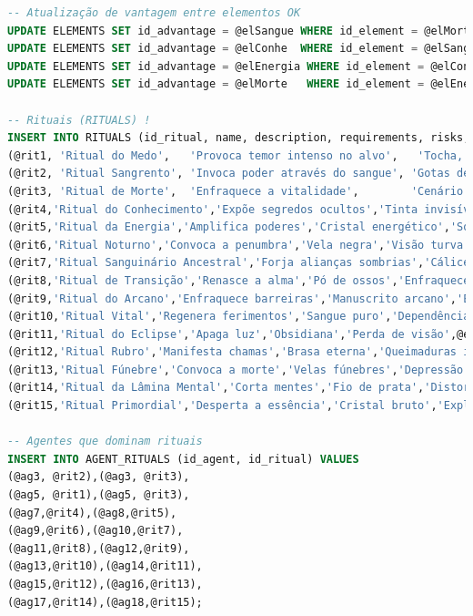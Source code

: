 \documentclass[12pt,a4paper]{report}
\begin{document}
\begin{lstlisting}[language=SQL, caption=population.sql]
-- Atualização de vantagem entre elementos OK
UPDATE ELEMENTS SET id_advantage = @elSangue WHERE id_element = @elMorte;
UPDATE ELEMENTS SET id_advantage = @elConhe  WHERE id_element = @elSangue;
UPDATE ELEMENTS SET id_advantage = @elEnergia WHERE id_element = @elConhe;
UPDATE ELEMENTS SET id_advantage = @elMorte   WHERE id_element = @elEnergia;

-- Rituais (RITUALS) !
INSERT INTO RITUALS (id_ritual, name, description, requirements, risks, id_element) VALUES
(@rit1, 'Ritual do Medo',   'Provoca temor intenso no alvo',   'Tocha, sal grosso',              'Reações psicóticas', @elMedo),
(@rit2, 'Ritual Sangrento', 'Invoca poder através do sangue', 'Gotas de sangue verdadeiro',     'Hemorragia grave',   @elSangue),
(@rit3, 'Ritual de Morte',  'Enfraquece a vitalidade',        'Cenário fúnebre, ossos',         'Desgaste físico',    @elMorte),
(@rit4,'Ritual do Conhecimento','Expõe segredos ocultos','Tinta invisível','Visões perturbadoras',@elConhe),
(@rit5,'Ritual da Energia','Amplifica poderes','Cristal energético','Sobrecarga vital',@elEnergia),
(@rit6,'Ritual Noturno','Convoca a penumbra','Vela negra','Visão turva',@elMedo),
(@rit7,'Ritual Sanguinário Ancestral','Forja alianças sombrias','Cálice ancestral','Maldição prolongada',@elSangue),
(@rit8,'Ritual de Transição','Renasce a alma','Pó de ossos','Enfraquece espírito',@elMorte),
(@rit9,'Ritual do Arcano','Enfraquece barreiras','Manuscrito arcano','Esgotamento mental',@elConhe),
(@rit10,'Ritual Vital','Regenera ferimentos','Sangue puro','Dependência',@elEnergia),
(@rit11,'Ritual do Eclipse','Apaga luz','Obsidiana','Perda de visão',@elMedo),
(@rit12,'Ritual Rubro','Manifesta chamas','Brasa eterna','Queimaduras internas',@elSangue),
(@rit13,'Ritual Fúnebre','Convoca a morte','Velas fúnebres','Depressão profunda',@elMorte),
(@rit14,'Ritual da Lâmina Mental','Corta mentes','Fio de prata','Distorção psíquica',@elConhe),
(@rit15,'Ritual Primordial','Desperta a essência','Cristal bruto','Explosão de energia',@elEnergia);

-- Agentes que dominam rituais
INSERT INTO AGENT_RITUALS (id_agent, id_ritual) VALUES
(@ag3, @rit2),(@ag3, @rit3),
(@ag5, @rit1),(@ag5, @rit3),
(@ag7,@rit4),(@ag8,@rit5),
(@ag9,@rit6),(@ag10,@rit7),
(@ag11,@rit8),(@ag12,@rit9),
(@ag13,@rit10),(@ag14,@rit11),
(@ag15,@rit12),(@ag16,@rit13),
(@ag17,@rit14),(@ag18,@rit15);


\end{lstlisting}
\end{document}
